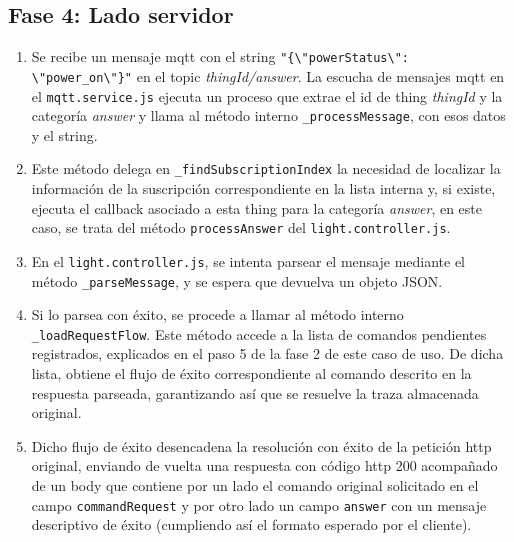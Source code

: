 \subsection{Fase 4: Lado servidor}
\label{ch:Capitulo5.3.4}
\begin{enumerate}
\item  Se recibe un mensaje \gls{mqtt} con el string \verb|"{\"powerStatus\": \"power_on\"}"| en el topic \textit{thingId/answer}. La escucha de mensajes \gls{mqtt} en el \verb|mqtt.service.js| ejecuta un proceso que extrae el id de thing \textit{thingId} y la categoría \textit{answer} y llama al método interno \verb|_processMessage|, con esos datos y el string.

\item  Este método delega en \verb|_findSubscriptionIndex| la necesidad de localizar la información de la suscripción correspondiente en la lista interna y, si existe, ejecuta el callback asociado a esta thing para la categoría \textit{answer}, en este caso, se trata del método \verb|processAnswer| del \verb|light.controller.js|.

\item  En el \verb|light.controller.js|, se intenta parsear el mensaje mediante el método \verb|_parseMessage|, y se espera que devuelva un objeto JSON.

\item  Si lo parsea con éxito, se procede a llamar al método interno \verb|_loadRequestFlow|. Este método accede a la lista de comandos pendientes registrados, explicados en el paso 5 de la fase 2 de este caso de uso. De dicha lista, obtiene el flujo de éxito correspondiente al comando descrito en la respuesta parseada, garantizando así que se resuelve la traza almacenada original.

\item  Dicho flujo de éxito desencadena la resolución con éxito de la petición http original, enviando de vuelta una respuesta con código http 200 acompañado de un body que contiene por un lado el comando original solicitado en el campo \verb|commandRequest| y por otro lado un campo \verb|answer| con un mensaje descriptivo de éxito (cumpliendo así el formato esperado por el cliente).
\end{enumerate}

